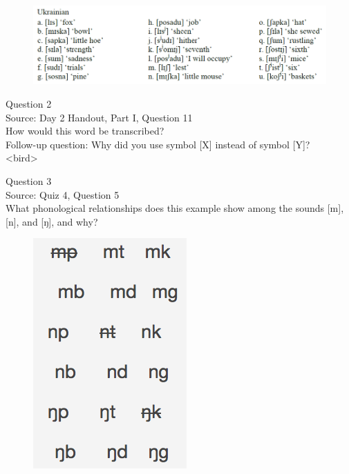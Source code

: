 \documentclass[12pt]{article}
\begin{document}
\begin{figure}[H]
\includegraphics{../images/ukrainian.png}
\end{figure}

\newpage

{\large Question 2}\\

Source: Day 2 Handout, Part I, Question 11\\

How would this word be transcribed?\\ Follow-up question: Why did you use symbol [X] instead of symbol [Y]?\\

<bird>


\newpage

{\large Question 3}\\

Source: Quiz 4, Question 5\\

What phonological relationships does this example show among the sounds [m], [n], and [ŋ], and why?\\

\begin{figure}[H]
\includegraphics{../images/quiz4question5_d.png}
\end{figure}
\end{document}
